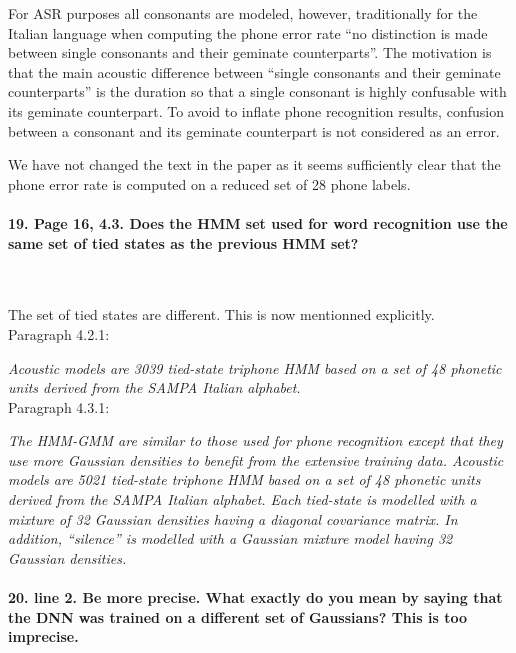 \documentclass[]{article}
\begin{document}
For ASR  purposes all  consonants are modeled,  however, traditionally
for  the Italian  language when  computing the  phone error  rate ``no                                                    
distinction  is  made between  single  consonants  and their  geminate                                                    
counterparts''. The  motivation is  that the main  acoustic difference
between ``single  consonants and their geminate  counterparts'' is the
duration  so that  a single  consonant is  highly confusable  with its
geminate counterpart.  To avoid to inflate  phone recognition results,
confusion  between a  consonant and  its geminate  counterpart  is not
considered as an error.

We have  not changed the  text in the  paper as it  seems sufficiently
clear that  the phone error rate is  computed on a reduced  set of 28
phone labels.


\paragraph{19. Page 16, 4.3. Does the HMM set used for word recognition use the same set of tied states as the previous HMM set?}

~

The set of tied states are different. This is now mentionned explicitly.\\
Paragraph 4.2.1:

\textit{Acoustic models  are 3039 tied-state triphone HMM based on a set of 48 phonetic units derived from the SAMPA Italian alphabet.}
\\
Paragraph 4.3.1:

\textit{The HMM-GMM are similar to those used for phone recognition except that they use more Gaussian densities to benefit from the extensive training data. Acoustic models  are 5021 tied-state triphone HMM based on a set of  48 phonetic units  derived from the  SAMPA Italian alphabet. Each tied-state is modelled with  a mixture of  32 Gaussian densities   having  a  diagonal   covariance  matrix. In  addition, ``silence''  is  modelled  with  a  Gaussian mixture  model  having  32 Gaussian densities.}
\paragraph{20. line 2. Be more precise. What exactly do you mean by saying that the DNN was trained on a different set of Gaussians? This is too imprecise.}

~
\end{document}
